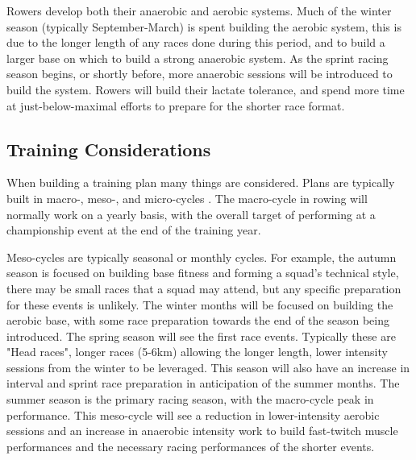 Rowers develop both their anaerobic and aerobic systems. Much of the winter season (typically September-March) is spent building the aerobic system, this is due to the longer length of any races done during this period, and to build a larger base on which to build a strong anaerobic system. As the sprint racing season begins, or shortly before, more anaerobic sessions will be introduced to build the system. Rowers will build their lactate tolerance, and spend more time at just-below-maximal efforts to prepare for the shorter race format.


\subsection{Training Considerations}
When building a training plan many things are considered. Plans are typically built in macro-, meso-, and micro-cycles \cite{periodisation}. The macro-cycle in rowing will normally work on a yearly basis, with the overall target of performing at a championship event at the end of the training year. 

Meso-cycles are typically seasonal or monthly cycles. For example, the autumn season is focused on building base fitness and forming a squad's technical style, there may be small races that a squad may attend, but any specific preparation for these events is unlikely. The winter months will be focused on building the aerobic base, with some race preparation towards the end of the season being introduced. The spring season will see the first race events. Typically these are "Head races", longer races (5-6km) allowing the longer length, lower intensity sessions from the winter to be leveraged. This season will also have an increase in interval and sprint race preparation in anticipation of the summer months. The summer season is the primary racing season, with the macro-cycle peak in performance. This meso-cycle will see a reduction in lower-intensity aerobic sessions and an increase in anaerobic intensity work to build fast-twitch muscle performances and the necessary racing performances of the shorter events.

